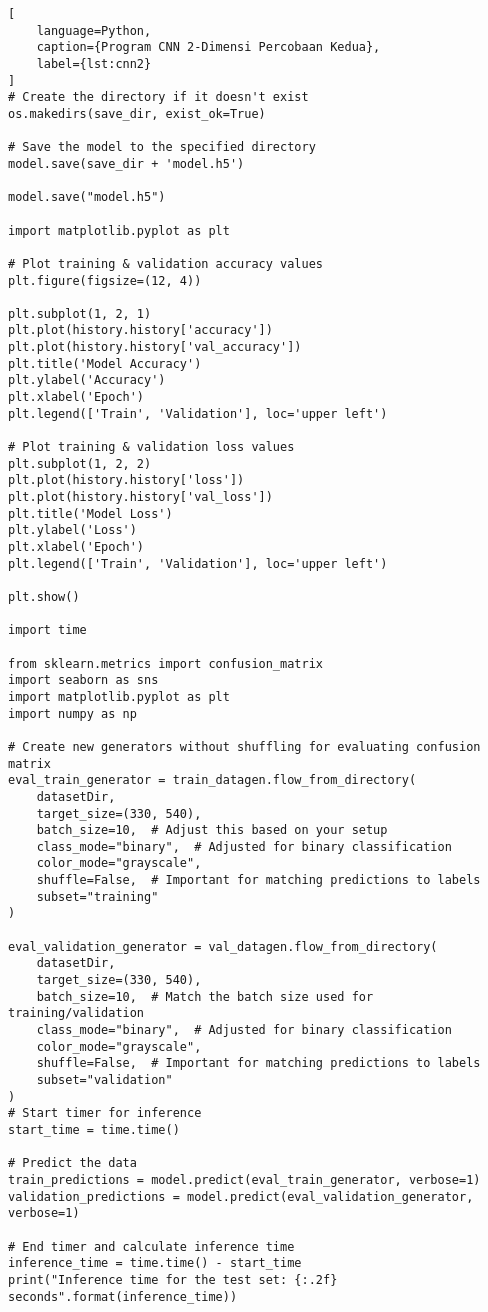 \begin{lstlisting}[
    language=Python,
    caption={Program CNN 2-Dimensi Percobaan Kedua},
    label={lst:cnn2}
]
# Create the directory if it doesn't exist
os.makedirs(save_dir, exist_ok=True)

# Save the model to the specified directory
model.save(save_dir + 'model.h5')

model.save("model.h5")

import matplotlib.pyplot as plt

# Plot training & validation accuracy values
plt.figure(figsize=(12, 4))

plt.subplot(1, 2, 1)
plt.plot(history.history['accuracy'])
plt.plot(history.history['val_accuracy'])
plt.title('Model Accuracy')
plt.ylabel('Accuracy')
plt.xlabel('Epoch')
plt.legend(['Train', 'Validation'], loc='upper left')

# Plot training & validation loss values
plt.subplot(1, 2, 2)
plt.plot(history.history['loss'])
plt.plot(history.history['val_loss'])
plt.title('Model Loss')
plt.ylabel('Loss')
plt.xlabel('Epoch')
plt.legend(['Train', 'Validation'], loc='upper left')

plt.show()

import time

from sklearn.metrics import confusion_matrix
import seaborn as sns
import matplotlib.pyplot as plt
import numpy as np

# Create new generators without shuffling for evaluating confusion matrix
eval_train_generator = train_datagen.flow_from_directory(
    datasetDir,
    target_size=(330, 540),
    batch_size=10,  # Adjust this based on your setup
    class_mode="binary",  # Adjusted for binary classification
    color_mode="grayscale",
    shuffle=False,  # Important for matching predictions to labels
    subset="training"
)

eval_validation_generator = val_datagen.flow_from_directory(
    datasetDir,
    target_size=(330, 540),
    batch_size=10,  # Match the batch size used for training/validation
    class_mode="binary",  # Adjusted for binary classification
    color_mode="grayscale",
    shuffle=False,  # Important for matching predictions to labels
    subset="validation"
)
# Start timer for inference
start_time = time.time()

# Predict the data
train_predictions = model.predict(eval_train_generator, verbose=1)
validation_predictions = model.predict(eval_validation_generator, verbose=1)

# End timer and calculate inference time
inference_time = time.time() - start_time
print("Inference time for the test set: {:.2f} seconds".format(inference_time))


\end{lstlisting}
